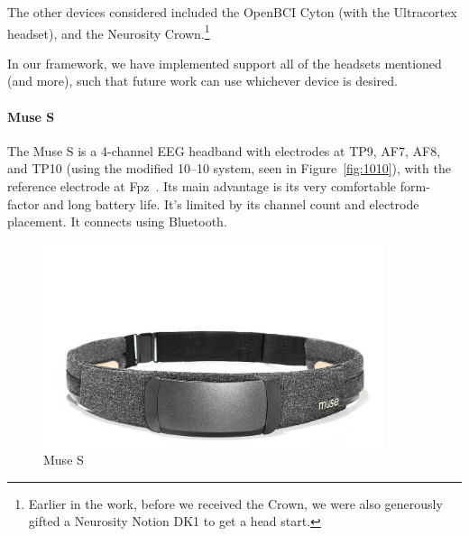     The other devices considered included the OpenBCI Cyton (with the Ultracortex headset), and the Neurosity Crown.\footnote{Earlier in the work, before we received the Crown, we were also generously gifted a Neurosity Notion DK1 to get a head start.} 

    In our framework, we have implemented support all of the headsets mentioned (and more), such that future work can use whichever device is desired.

    \vspace{0.5cm}
    
    \vspace{0.5cm}

    \begin{minipage}{\textwidth}
        \paragraph*{Muse S}
        The Muse S is a 4-channel EEG headband with electrodes at TP9, AF7, AF8, and TP10 (using the modified 10--10 system, seen in Figure~\ref{fig:1010}), with the reference electrode at Fpz~\cite{krigolson_choosing_2017}. Its main advantage is its very comfortable form-factor and long battery life. It's limited by its channel count and electrode placement. It connects using Bluetooth.

        \begin{figure}[H]
            \centering
            \includegraphics[trim=0 0 0 200,clip,width=100mm]{img/Muse-S.jpg}
            \caption{Muse S}\label{fig:museS}
        \end{figure}
    \end{minipage}

